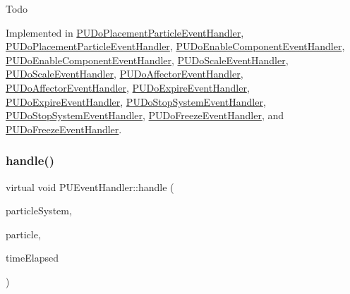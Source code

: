 Todo 

Implemented in \hyperlink{classPUDoPlacementParticleEventHandler_a12d37fe5d03f1b25b5ba62020d792b3b}{P\+U\+Do\+Placement\+Particle\+Event\+Handler}, \hyperlink{classPUDoPlacementParticleEventHandler_a315d038959b01349560a1e222e3bcfb9}{P\+U\+Do\+Placement\+Particle\+Event\+Handler}, \hyperlink{classPUDoEnableComponentEventHandler_a6d84593dc83b908717c15a5c973d10b4}{P\+U\+Do\+Enable\+Component\+Event\+Handler}, \hyperlink{classPUDoEnableComponentEventHandler_a1c27b9000122f25304629fd2487c6e50}{P\+U\+Do\+Enable\+Component\+Event\+Handler}, \hyperlink{classPUDoScaleEventHandler_a0d4d629277b91a58487794e2791f041d}{P\+U\+Do\+Scale\+Event\+Handler}, \hyperlink{classPUDoScaleEventHandler_abf88206cfacb19b198323e5a15c74f6a}{P\+U\+Do\+Scale\+Event\+Handler}, \hyperlink{classPUDoAffectorEventHandler_a73dcf140c4011202233774858c1b6e02}{P\+U\+Do\+Affector\+Event\+Handler}, \hyperlink{classPUDoAffectorEventHandler_a5eb0b94268f5f65462590649b53b50e6}{P\+U\+Do\+Affector\+Event\+Handler}, \hyperlink{classPUDoExpireEventHandler_a13edfa6a313f4306bb4815c670d98689}{P\+U\+Do\+Expire\+Event\+Handler}, \hyperlink{classPUDoExpireEventHandler_a28cf9f9bea21b57152c12c52ff6eff91}{P\+U\+Do\+Expire\+Event\+Handler}, \hyperlink{classPUDoStopSystemEventHandler_ad80081500e5553c7a76c2f0b966b9f42}{P\+U\+Do\+Stop\+System\+Event\+Handler}, \hyperlink{classPUDoStopSystemEventHandler_aedf9765b3b2652fd3828f4be017a727c}{P\+U\+Do\+Stop\+System\+Event\+Handler}, \hyperlink{classPUDoFreezeEventHandler_a961d110b3aa250a3a2d9d95a049aa299}{P\+U\+Do\+Freeze\+Event\+Handler}, and \hyperlink{classPUDoFreezeEventHandler_a0203ad7344e56fb7c6676222973da0cc}{P\+U\+Do\+Freeze\+Event\+Handler}.

\mbox{\label{classPUEventHandler_a760172609708c65548dcac364c9b3b9c}} 
\subsubsection{\texorpdfstring{handle()}{handle()}\hspace{0.1cm}{\footnotesize\ttfamily [2/2]}}
{\footnotesize\ttfamily virtual void P\+U\+Event\+Handler\+::handle (\begin{DoxyParamCaption}\item[{\hyperlink{classPUParticleSystem3D}{P\+U\+Particle\+System3D} $\ast$}]{particle\+System,  }\item[{\hyperlink{structPUParticle3D}{P\+U\+Particle3D} $\ast$}]{particle,  }\item[{float}]{time\+Elapsed }\end{DoxyParamCaption})\hspace{0.3cm}{\ttfamily [pure virtual]}}

